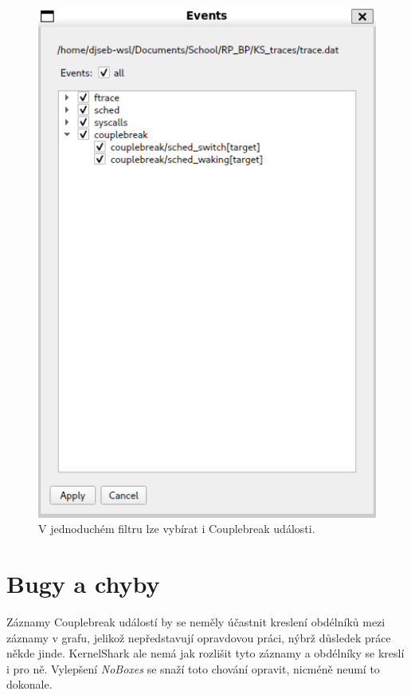 \begin{figure}[p]\centering
    \includegraphics[width=140mm]{img/Modifikace/modif-couplebreak-filter}
    \caption{V jednoduchém filtru lze vybírat i Couplebreak události.}
    \label{cbreak-filter}
\end{figure}

\section{Bugy a chyby}

Záznamy Couplebreak událostí by se neměly účastnit kreslení obdélníků mezi záznamy v grafu, jelikož nepředstavují opravdovou práci, nýbrž důsledek práce někde jinde. KernelShark ale nemá jak rozlišit tyto záznamy a obdélníky se kreslí i pro ně. Vylepšení \emph{NoBoxes} se snaží toto chování opravit, nicméně neumí to dokonale.

